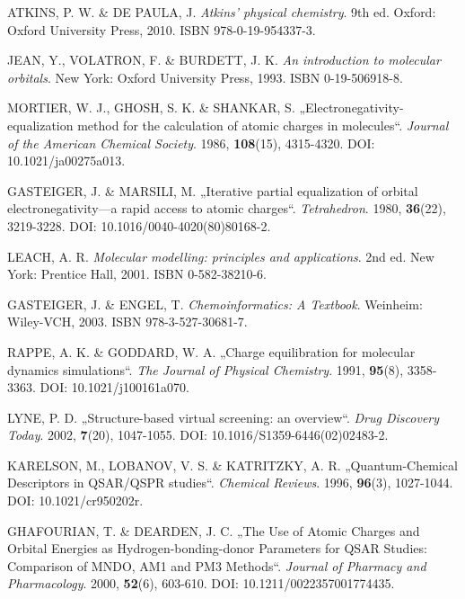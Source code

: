\begin{thebibliography}{10}

ATKINS, P. W. \& DE PAULA, J. \textit{Atkins' physical chemistry}. 9th ed. Oxford: Oxford University Press, 2010. ISBN 978-0-19-954337-3.

JEAN, Y., VOLATRON, F. \& BURDETT, J. K. \textit{An introduction to molecular orbitals}. New York: Oxford University Press, 1993. ISBN 0-19-506918-8.

MORTIER, W. J., GHOSH, S. K. \& SHANKAR, S. „Electronegativity-equalization method for the calculation of atomic charges in molecules“. \textit{Journal of the American Chemical Society}. 1986, \textbf{108}(15), 4315-4320. DOI: 10.1021/ja00275a013.

GASTEIGER, J. \& MARSILI, M. „Iterative partial equalization of orbital electronegativity—a rapid access to atomic charges“. \textit{Tetrahedron}. 1980, \textbf{36}(22), 3219-3228. DOI: 10.1016/0040-4020(80)80168-2.

LEACH, A. R. \textit{Molecular modelling: principles and applications}. 2nd ed. New York: Prentice Hall, 2001. ISBN 0-582-38210-6.

GASTEIGER, J. \& ENGEL, T. \textit{Chemoinformatics: A Textbook}. Weinheim: Wiley-VCH, 2003. ISBN 978-3-527-30681-7.

RAPPE, A. K. \& GODDARD, W. A. „Charge equilibration for molecular dynamics simulations“. \textit{The Journal of Physical Chemistry}. 1991, \textbf{95}(8), 3358-3363. DOI: 10.1021/j100161a070.

LYNE, P. D. „Structure-based virtual screening: an overview“. \textit{Drug Discovery Today}. 2002, \textbf{7}(20), 1047-1055. DOI: 10.1016/S1359-6446(02)02483-2.

KARELSON, M., LOBANOV, V. S. \& KATRITZKY, A. R. „Quantum-Chemical Descriptors in QSAR/QSPR studies“. \textit{Chemical Reviews}. 1996, \textbf{96}(3), 1027-1044. DOI: 10.1021/cr950202r.

GHAFOURIAN, T. \& DEARDEN, J. C. „The Use of Atomic Charges and Orbital Energies as Hydrogen-bonding-donor Parameters for QSAR Studies: Comparison of MNDO, AM1 and PM3 Methods“. \textit{Journal of Pharmacy and Pharmacology}. 2000, \textbf{52}(6), 603-610. DOI: 10.1211/0022357001774435.


\end{thebibliography}
